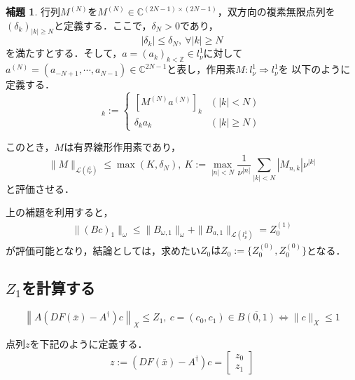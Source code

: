 \documentclass[11pt,a4paper,titlepage]{jsreport}
\theoremstyle{definition}
\newtheorem{lmm}{補題}
\begin{document}
\begin{lmm}
  行列$M^{(N)}$を$M^{(N)} \in \mathbb{C}^{(2N-1) \times (2N-1)}$，双方向の複素無限点列を$(\delta_k)_{|k| \geq N}$と定義する．ここで，$\delta_N > 0$であり，
  \begin{equation*}
    |\delta_k| \leq \delta_N,\ \forall |k| \geq N
  \end{equation*}
  を満たすとする．そして，$a=(a_k)_{k<\mathbb{Z}} \in l_\nu^1$に対して$a^{(N)}=(a_{-N+1},\cdots,a_{N-1})\in \mathbb{C}^{2N-1}$と表し，作用素$M:l_\nu^1 \Rightarrow l_\nu^1$を
  以下のように定義する．
  \begin{equation*}
    [Ma]_k := \begin{cases}
      [M^{(N)}a^{(N)}]_k & (|k|<N)     \\
      \delta_k a_k       & (|k|\geq N)
    \end{cases}
  \end{equation*}

  このとき，$M$は有界線形作用素であり，
  \begin{equation*}
    \|M\|_{\mathcal{L}(l_\nu^1)} \leq \max \left( K,\delta_N \right),\ K:=\max_{|n|<N} \frac{1}{\nu^{|n|}} \sum_{|k|<N} |M_{n,k}| \nu^{|k|}
  \end{equation*}
  と評価させる．
\end{lmm}

上の補題を利用すると，
\begin{eqnarray}
  \|(Bc)_1\|_\omega \leq \|B_{\omega,1}\|_\omega + \|B_{a,1}\|_{\mathcal{L}(l_\nu^1)} = Z_0^{(1)}
\end{eqnarray}
が評価可能となり，結論としては，求めたい$Z_0はZ_0:=\{Z_0^{(0)},Z_0^{(0)}\}$となる．

\subsection{$Z_1$を計算する}
\begin{equation*}
  \left\| A \left( DF \left( \bar{x} \right) - A^\dagger \right) c \right\|_X \leq Z_1,\ c=(c_0,c_1) \in \overline{B(0,1)} \Leftrightarrow \|c\|_X \leq 1
\end{equation*}

点列$z$を下記のように定義する．
\begin{equation}
  z := \left(DF(\bar{x})-A^\dagger\right)c = \begin{bmatrix}
    z_0 \\
    z_1
  \end{bmatrix}
\end{equation}
\end{document}

